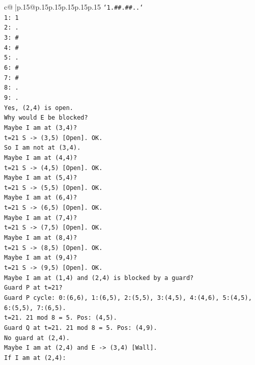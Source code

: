 \documentclass{article}
\begin{document}
{\begin{supertabular}{c@{$\;$}|p{.15\linewidth}@{}p{.15\linewidth}p{.15\linewidth}p{.15\linewidth}p{.15\linewidth}p{.15\linewidth}}
{{{\texttt{`1.\#\#.\#\#..`} \\
\texttt{1: 1} \\
\texttt{2: .} \\
\texttt{3: \#} \\
\texttt{4: \#} \\
\texttt{5: .} \\
\texttt{6: \#} \\
\texttt{7: \#} \\
\texttt{8: .} \\
\texttt{9: .} \\
\texttt{Yes, (2,4) is open.} \\
\texttt{Why would E be blocked?} \\
\texttt{Maybe I am at (3,4)?} \\
\texttt{t=21 S {-}> (3,5) {[}Open{]}. OK.} \\
\texttt{So I am not at (3,4).} \\
\texttt{Maybe I am at (4,4)?} \\
\texttt{t=21 S {-}> (4,5) {[}Open{]}. OK.} \\
\texttt{Maybe I am at (5,4)?} \\
\texttt{t=21 S {-}> (5,5) {[}Open{]}. OK.} \\
\texttt{Maybe I am at (6,4)?} \\
\texttt{t=21 S {-}> (6,5) {[}Open{]}. OK.} \\
\texttt{Maybe I am at (7,4)?} \\
\texttt{t=21 S {-}> (7,5) {[}Open{]}. OK.} \\
\texttt{Maybe I am at (8,4)?} \\
\texttt{t=21 S {-}> (8,5) {[}Open{]}. OK.} \\
\texttt{Maybe I am at (9,4)?} \\
\texttt{t=21 S {-}> (9,5) {[}Open{]}. OK.} \\
\texttt{Maybe I am at (1,4) and (2,4) is blocked by a guard?} \\
\texttt{Guard P at t=21?} \\
\texttt{Guard P cycle: 0:(6,6), 1:(6,5), 2:(5,5), 3:(4,5), 4:(4,6), 5:(4,5), 6:(5,5), 7:(6,5).} \\
\texttt{t=21. 21 mod 8 = 5. Pos: (4,5).} \\
\texttt{Guard Q at t=21. 21 mod 8 = 5. Pos: (4,9).} \\
\texttt{No guard at (2,4).} \\
\texttt{Maybe I am at (2,4) and E {-}> (3,4) {[}Wall{]}.} \\
\texttt{If I am at (2,4):} \\
}}}
\end{supertabular}}
\end{document}
